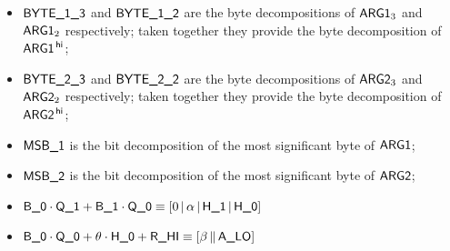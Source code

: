 \begin{itemize}
	\item $\textsf{BYTE}\textsf{\_1\_3}$ and $\textsf{BYTE}\textsf{\_1\_2}$ are the byte decompositions of $\textsf{ARG}\textsf{1}_{3}$ and $\textsf{ARG}\textsf{1}_{2}$ respectively; taken together they provide the byte decomposition of $\textsf{ARG}\textsf{1}^{\mathsf{\,hi}}$; 
	\item $\textsf{BYTE}\textsf{\_2\_3}$ and $\textsf{BYTE}\textsf{\_2\_2}$ are the byte decompositions of $\textsf{ARG}\textsf{2}_{3}$ and $\textsf{ARG}\textsf{2}_{2}$ respectively; taken together they provide the byte decomposition of $\textsf{ARG}\textsf{2}^{\mathsf{\,hi}}$; 
	\item $\textsf{MSB\_1}$ is the bit decomposition of the most significant byte of $\textsf{ARG}\textsf{1}$;
	\item $\textsf{MSB\_2}$ is the bit decomposition of the most significant byte of $\textsf{ARG}\textsf{2}$;
	\item $\textsf{B\_0} \cdot \textsf{Q\_1} + \textsf{B\_1} \cdot \textsf{Q\_0} \equiv [0 \,|\, \alpha \,|\, \textsf{H\_1} \,|\, \textsf{H\_0}]$
	\item $\textsf{B\_0} \cdot \textsf{Q\_0}  + \theta \cdot \textsf{H\_0} + \textsf{R\_HI} \equiv [\beta \,\|\, \textsf{A\_LO}]$
\end{itemize}
